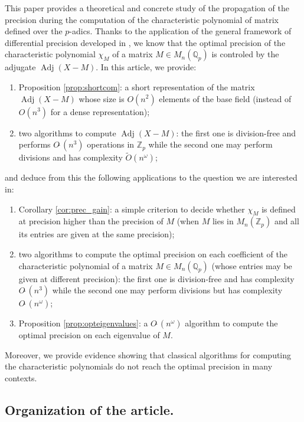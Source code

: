 \documentclass{sig-alternate-05-2015}
\DeclareMathOperator{\adj}{Adj}
\newcommand{\Z}{\mathbb Z}
\newcommand{\Zp}{\Z_p}
\newcommand{\Q}{\mathbb Q}
\newcommand{\Qp}{\Q_p}
\newcommand{\softO}{O\tilde{~}}
\begin{document}
This paper provides a theoretical and concrete study of the propagation 
of the precision during the computation of the characteristic polynomial 
of matrix defined over the $p$-adics. Thanks to the application of the 
general framework of differential precision developed in 
\cite{caruso-roe-vaccon:14a,caruso-roe-vaccon:15a}, we know that the 
optimal precision of the characteristic polynomial $\chi_M$ of a matrix 
$M \in M_n(\mathbb{Q}_p)$ is controled by the adjugate $\adj(X{-}M).$
In this article, we provide:
\begin{enumerate}
\renewcommand{\itemsep}{0pt}
\item Proposition \ref{prop:shortcom}: a short representation of
the matrix $\adj(X{-}M)$ whose size is $O(n^2)$ elements of the base
field (instead of $O(n^3)$ for a dense representation);
\item two algorithms to compute $\adj(X{-}M)$: the first one is 
division-free and performs $\softO(n^3)$ operations in $\Zp$ while 
the second one may perform divisions and has complexity $\tilde 
O(n^\omega)$;
\end{enumerate}
and deduce from this the following applications to the question
we are interested in:
\begin{enumerate}
\renewcommand{\itemsep}{0pt}
\setcounter{enumi}{2}
\item Corollary \ref{cor:prec_gain}: a simple criterion to decide 
whether $\chi_M$ is defined at precision higher than the precision of 
$M$ (when $M$ lies in $M_n(\mathbb{Z}_p)$ and all its entries are given 
at the same precision);
\item two algorithms to compute the optimal precision on each 
coefficient of the characteristic polynomial of a matrix $M \in 
M_n(\Qp)$ (whose entries may be given at different precision): the first 
one is division-free and has complexity $\softO(n^3)$ while the second 
one may perform divisions but has complexity $\softO(n^\omega)$;
\item Proposition \ref{prop:opteigenvalues}: a $\softO(n^\omega)$
algorithm to compute the optimal precision on each eigenvalue of $M$.
\end{enumerate}
Moreover, we provide evidence showing that classical algorithms for 
computing the characteristic polynomials do not reach the optimal 
precision in many contexts.

\subsection*{Organization of the article.}
\end{document}
